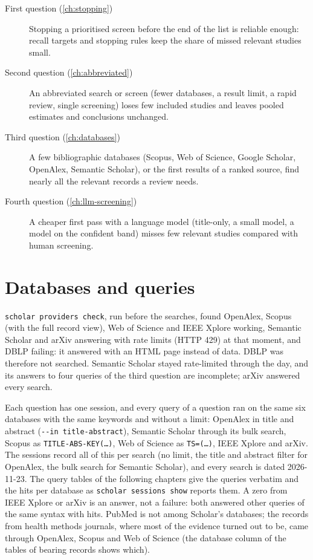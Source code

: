 \begin{description}
\item[First question (\cref{ch:stopping})] Stopping a prioritised screen
  before the end of the list is reliable enough: recall targets and
  stopping rules keep the share of missed relevant studies small.
\item[Second question (\cref{ch:abbreviated})] An abbreviated search or
  screen (fewer databases, a result limit, a rapid review, single
  screening) loses few included studies and leaves pooled estimates and
  conclusions unchanged.
\item[Third question (\cref{ch:databases})] A few bibliographic databases
  (Scopus, Web of Science, Google Scholar, OpenAlex, Semantic Scholar), or
  the first results of a ranked source, find nearly all the relevant
  records a review needs.
\item[Fourth question (\cref{ch:llm-screening})] A cheaper first pass
  with a language model (title-only, a small model, a model on the
  confident band) misses few relevant studies compared with human
  screening.
\end{description}

\section{Databases and queries}
\label{sec:search-databases}

\texttt{scholar providers check}, run before the searches, found
OpenAlex, Scopus (with the full record view), Web of Science and IEEE
Xplore working, Semantic Scholar and arXiv answering with rate limits
(HTTP 429) at that moment, and DBLP failing: it answered with an HTML page
instead of data.
DBLP was therefore not searched.
Semantic Scholar stayed rate-limited through the day, and its answers to
four queries of the third question are incomplete; arXiv answered every
search.

Each question has one session, and every query of a question ran on the
same six databases with the same keywords and without a limit:
OpenAlex in title and abstract (\texttt{-{}-in title-abstract}), Semantic
Scholar through its bulk search, Scopus as \texttt{TITLE-ABS-KEY(\dots)},
Web of Science as \texttt{TS=(\dots)}, IEEE Xplore and arXiv.
The sessions record all of this per search (no limit, the title and
abstract filter for OpenAlex, the bulk search for Semantic Scholar), and
every search is dated 2026-11-23.
The query tables of the following chapters give the queries verbatim and
the hits per database as \texttt{scholar sessions show} reports them.
A zero from IEEE Xplore or arXiv is an answer, not a failure: both
answered other queries of the same syntax with hits.
PubMed is not among Scholar's databases; the records from health methods
journals, where most of the evidence turned out to be, came through
OpenAlex, Scopus and Web of Science (the database column of the tables
of bearing records shows which).

